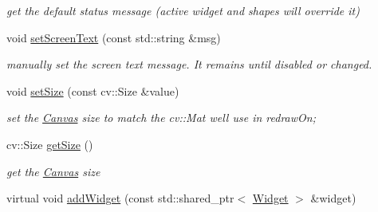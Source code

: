 \begin{DoxyCompactItemize}
\begin{DoxyCompactList}\small\item\em get the default status message (active widget and shapes will override it) \end{DoxyCompactList}\item 
void \hyperlink{classcanvascv_1_1Canvas_aaedea276b82a8a4cfc0895ae81113cfd}{set\+Screen\+Text} (const std\+::string \&msg)\hypertarget{classcanvascv_1_1Canvas_aaedea276b82a8a4cfc0895ae81113cfd}{}\label{classcanvascv_1_1Canvas_aaedea276b82a8a4cfc0895ae81113cfd}

\begin{DoxyCompactList}\small\item\em manually set the screen text message. It remains until disabled or changed. \end{DoxyCompactList}\item 
void \hyperlink{classcanvascv_1_1Canvas_ab9ffc28f7a21e1375da18cc4f03343ae}{set\+Size} (const cv\+::\+Size \&value)\hypertarget{classcanvascv_1_1Canvas_ab9ffc28f7a21e1375da18cc4f03343ae}{}\label{classcanvascv_1_1Canvas_ab9ffc28f7a21e1375da18cc4f03343ae}

\begin{DoxyCompactList}\small\item\em set the \hyperlink{classcanvascv_1_1Canvas}{Canvas} size to match the cv\+::\+Mat we\textquotesingle{}ll use in redraw\+On; \end{DoxyCompactList}\item 
cv\+::\+Size \hyperlink{classcanvascv_1_1Canvas_a749efce55cfc1a16f6fdb91fab435bc4}{get\+Size} ()\hypertarget{classcanvascv_1_1Canvas_a749efce55cfc1a16f6fdb91fab435bc4}{}\label{classcanvascv_1_1Canvas_a749efce55cfc1a16f6fdb91fab435bc4}

\begin{DoxyCompactList}\small\item\em get the \hyperlink{classcanvascv_1_1Canvas}{Canvas} size \end{DoxyCompactList}\item 
virtual void \hyperlink{classcanvascv_1_1Canvas_a830b59fb09fe8f493c895d96316f6f36}{add\+Widget} (const std\+::shared\+\_\+ptr$<$ \hyperlink{classcanvascv_1_1Widget}{Widget} $>$ \&widget)\hypertarget{classcanvascv_1_1Canvas_a830b59fb09fe8f493c895d96316f6f36}{}\label{classcanvascv_1_1Canvas_a830b59fb09fe8f493c895d96316f6f36}


\end{DoxyCompactItemize}
